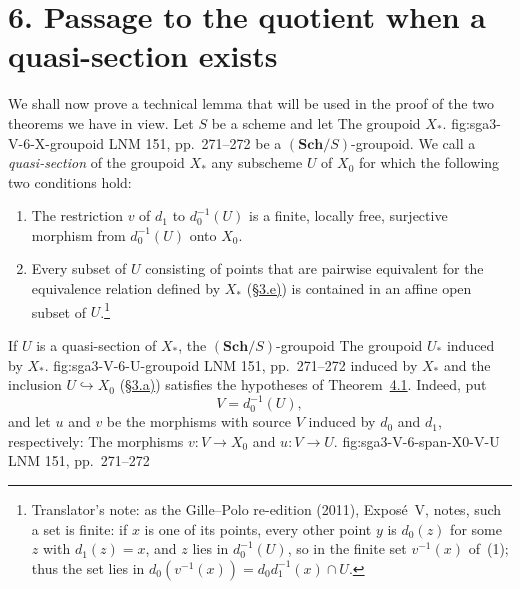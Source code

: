
\section*{6. Passage to the quotient when a quasi-section exists}
\label{sec:sga3-V-6}

We shall now prove a technical lemma that will be used in the proof of
the two theorems we have in view. Let \(S\) be a scheme and let
  {The groupoid \(X_\ast\).}
  {fig:sga3-V-6-X-groupoid}
  {LNM 151, pp.~271--272}
be a \((\mathbf{Sch}/S)\)-groupoid. We call a \emph{quasi-section} of
the groupoid \(X_\ast\) any subscheme \(U\) of \(X_0\) for which the
following two conditions hold:
\begin{enumerate}
\item[(1)]\label{def:sga3-V-6-quasisection-1}%
The restriction \(v\) of \(d_1\) to \(d_0^{-1}(U)\) is a
  finite, locally free, surjective morphism from \(d_0^{-1}(U)\) onto
  \(X_0\).
\item[(2)]\label{def:sga3-V-6-quasisection-2}%
Every subset of \(U\) consisting of points that are
  pairwise equivalent for the equivalence relation defined by
  \(X_\ast\) (\hyperref[par:sga3-V-3-e]{\S3.e)}) is contained in an affine open
  subset of \(U\).\footnote{Translator's note: as the Gille--Polo re-edition (2011), Exposé~V, notes,
  such a set is finite: if \(x\) is one of its points, every other point \(y\) is
  \(d_0(z)\) for some \(z\) with \(d_1(z)=x\), and \(z\) lies in \(d_0^{-1}(U)\), so in the
  finite set \(v^{-1}(x)\) of~(1); thus the set lies in
  \(d_0(v^{-1}(x))=d_0d_1^{-1}(x)\cap U\).}
\end{enumerate}

If \(U\) is a quasi-section of \(X_\ast\), the
\((\mathbf{Sch}/S)\)-groupoid
  {The groupoid \(U_\ast\) induced by \(X_\ast\).}
  {fig:sga3-V-6-U-groupoid}
  {LNM 151, pp.~271--272}
induced by \(X_\ast\) and the inclusion \(U\hookrightarrow X_0\)
(\hyperref[par:sga3-V-3-a]{\S3.a)}) satisfies the hypotheses of
Theorem~\hyperref[thm:sga3-V-4.1]{4.1}. Indeed, put
\[
  V=d_0^{-1}(U),
\]
and let \(u\) and \(v\) be the morphisms with source \(V\) induced by
\(d_0\) and \(d_1\), respectively:
  {The morphisms \(v:V\to X_0\) and \(u:V\to U\).}
  {fig:sga3-V-6-span-X0-V-U}
  {LNM 151, pp.~271--272}

